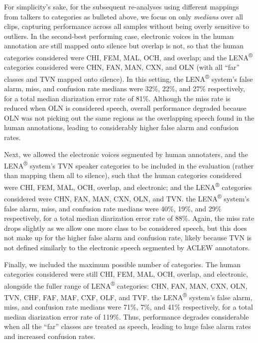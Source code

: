 \documentclass[english,floatsintext,man]{apa6}
\begin{document}
For simplicity's sake, for the subsequent re-analyses using different
mappings from talkers to categories as bulleted above, we focus on only
\emph{medians} over all clips, capturing performance across all samples
without being overly sensitive to outliers. In the second-best
performing case, electronic voices in the human annotation are still
mapped onto silence but overlap is not, so that the human categories
considered were CHI, FEM, MAL, OCH, and overlap; and the
LENA\textsuperscript{®} categories considered were CHN, FAN, MAN, CXN,
and OLN (with all \enquote{far} classes and TVN mapped onto silence). In
this setting, the LENA\textsuperscript{®} system's false alarm, miss,
and confusion rate medians were 32\%, 22\%, and 27\% respectively, for a
total median diarization error rate of 81\%. Although the miss rate is
reduced when OLN is considered speech, overall performance degraded
because OLN was not picking out the same regions as the overlapping
speech found in the human annotations, leading to considerably higher
false alarm and confusion rates.

Next, we allowed the electronic voices segmented by human annotaters,
and the LENA\textsuperscript{®} system's TVN speaker categories to be
included in the evaluation (rather than mapping them all to silence),
such that the human categories considered were CHI, FEM, MAL, OCH,
overlap, and electronic; and the LENA\textsuperscript{®} categories
considered were CHN, FAN, MAN, CXN, OLN, and TVN. the
LENA\textsuperscript{®} system's false alarm, miss, and confusion rate
medians were 40\%, 19\%, and 29\% respectively, for a total median
diarization error rate of 88\%. Again, the miss rate drops slightly as
we allow one more class to be considered speech, but this does not make
up for the higher false alarm and confusion rate, likely because TVN is
not defined similarly to the electronic speech segmented by ACLEW
annotators.

Finally, we included the maximum possible number of categories. The
human categories considered were still CHI, FEM, MAL, OCH, overlap, and
electronic, alongside the fuller range of LENA\textsuperscript{®}
categories: CHN, FAN, MAN, CXN, OLN, TVN, CHF, FAF, MAF, CXF, OLF, and
TVF. the LENA\textsuperscript{®} system's false alarm, miss, and
confusion rate medians were 71\%, 7\%, and 41\% respectively, for a
total median diarization error rate of 119\%. Thus, performance degrades
considerable when all the \enquote{far} classes are treated as speech,
leading to huge false alarm rates and increased confusion rates.
\end{document}

